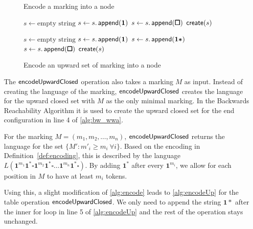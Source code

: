\begin{figure}
\begin{minipage}[t]{0.46\textwidth}
\begin{algorithm}[H]
\caption{Encode a marking into a node}\label{alg:encode}
\begin{algorithmic}[1]
\State $s \gets \text{empty string}$
\State $s \gets s.\operatorname{\textsf{append}}(\bm{1})$
\EndFor
\State $s \gets s.\operatorname{\textsf{append}}(\bm{\square})$
\EndFor
\Return $\operatorname{\textsf{create}} (s)$
\end{algorithmic}
\end{algorithm}
\end{minipage}
\hfill
\begin{minipage}[t]{0.46\textwidth}
\begin{algorithm}[H]
\caption{Encode an upward set of marking into a node}\label{alg:encodeUp}
\begin{algorithmic}[1]
\State $s \gets \text{empty string}$
\State $s \gets s.\operatorname{\textsf{append}}(\bm{1})$
\EndFor
\State $s \gets s.\operatorname{\textsf{append}}(\bm{1*})$
\State $s \gets s.\operatorname{\textsf{append}}(\bm{\square})$
\EndFor
\Return $\operatorname{\textsf{create}} (s)$
\end{algorithmic}
\end{algorithm}
\end{minipage}
\end{figure}

The $\operatorname{\textsf{encodeUpwardClosed}}$ operation also takes a marking $M$ as input. Instead of creating the language of the marking, $\operatorname{\textsf{encodeUpwardClosed}}$ creates the language for the upward closed set with $M$ as the only minimal marking. In the Backwards Reachability Algorithm it is used to create the upward closed set for the end configuration  in line 4 of \autoref{alg:bw_wwa}.
\par
For the marking $M=(m_{1},m_{2},\dots,m_{n})$, $\operatorname{\textsf{encodeUpwardClosed}}$ returns the language for the set $\{M': m'_{i} \ge m_{i} \ \forall i\}$. Based on the encoding in Definition~\autoref{def:encoding}, this is described by the language $L(\bm{1}^{m_{1}}\bm{1^{*}} \square \bm{1}^{m_{2}}\bm{1^{*}} \square \ldots \bm{1}^{m_{n}}\bm{1^{*}} \square)$. 
By adding $\bm{1^{*}}$ after every $\bm{1}^{m_{i}}$, we allow for each position in $M$ to have at least $m_{i}$ tokens.

\par
Using this, a slight modification of \autoref{alg:encode} leads to \autoref{alg:encodeUp} for the table operation $\operatorname{\textsf{encodeUpwardClosed}}$. We only need to append the string $\bm{1*}$ after the inner for loop in line 5 of \autoref{alg:encodeUp} and the rest of the operation stays unchanged. 

